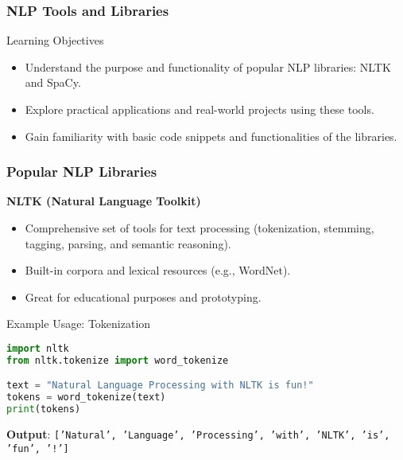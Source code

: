 \documentclass[aspectratio=169]{beamer}
\begin{document}
\begin{frame}[fragile]
    \frametitle{NLP Tools and Libraries}
    \begin{block}{Learning Objectives}
        \begin{itemize}
            \item Understand the purpose and functionality of popular NLP libraries: NLTK and SpaCy.
            \item Explore practical applications and real-world projects using these tools.
            \item Gain familiarity with basic code snippets and functionalities of the libraries.
        \end{itemize}
    \end{block}
\end{frame}

\begin{frame}[fragile]
    \frametitle{Popular NLP Libraries}
    \textbf{NLTK (Natural Language Toolkit)}
    \begin{itemize}
        \item Comprehensive set of tools for text processing (tokenization, stemming, tagging, parsing, and semantic reasoning).
        \item Built-in corpora and lexical resources (e.g., WordNet).
        \item Great for educational purposes and prototyping.
    \end{itemize}
    \begin{block}{Example Usage: Tokenization}
        \begin{lstlisting}[language=Python]
import nltk
from nltk.tokenize import word_tokenize

text = "Natural Language Processing with NLTK is fun!"
tokens = word_tokenize(text)
print(tokens)
        \end{lstlisting}
        \textbf{Output}: \texttt{['Natural', 'Language', 'Processing', 'with', 'NLTK', 'is', 'fun', '!']}
    \end{block}
\end{frame}
\end{document}
